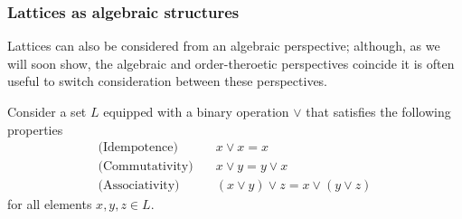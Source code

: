 \subsubsection{Lattices as algebraic structures}
\label{subsubsection:lattices-as-algebraic-structures}

Lattices can also be considered from an algebraic perspective; although, as we will soon show, the algebraic and order-theroetic perspectives coincide it is often useful to switch consideration between
these perspectives.

Consider a set $L$ equipped with a binary operation $\vee$ that satisfies the following properties
%
\begin{align}
  \text{(Idempotence)}   & \quad x \vee x = x \label{eq:idempotence}                            \\
  \text{(Commutativity)} & \quad x \vee y = y \vee x \label{eq:commutativity}                   \\
  \text{(Associativity)} & \quad (x \vee y) \vee z = x \vee (y \vee z) \label{eq:associativity}
\end{align}
for all elements $x,y,z \in L$.

